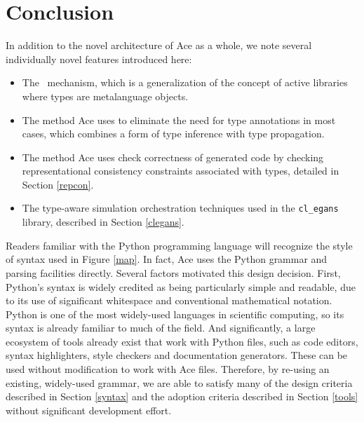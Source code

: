 \documentclass{sig-alternate}
\begin{document}
\section{Conclusion}
In addition to the novel architecture of Ace as a whole, we note several individually novel features introduced here: %

\begin{itemize}
\item The \ATT~mechanism, which is a generalization of the concept of active libraries \cite{activelibraries}  where types are metalanguage objects.
\item The method Ace uses to eliminate the need for type annotations in most cases, which combines a form of type inference with type propagation.
\item The method Ace uses check correctness of generated code by checking representational consistency constraints associated with types, detailed in Section \ref{repcon}. 
\item The type-aware simulation orchestration techniques used in the \texttt{cl\_egans} library, described in Section \ref{clegans}.
\end{itemize}

Readers familiar with the Python programming language will recognize the style of syntax used in Figure \ref{map}. In fact, Ace uses the Python grammar and parsing facilities directly. Several factors motivated this design decision. First, Python's syntax is widely credited as being particularly simple and readable, due to its use of significant whitespace and conventional mathematical notation. Python is one of the most widely-used languages in scientific computing, so its syntax is already familiar to much of the field. And significantly, a large ecosystem of tools already exist that work with Python files, such as code editors, syntax highlighters, style checkers and documentation generators. These can be used without modification to work with Ace files. Therefore, by re-using an existing, widely-used grammar, we are able to satisfy many of the design criteria described in Section \ref{syntax} and the adoption criteria described in Section \ref{tools} without significant development effort.
\end{document}

